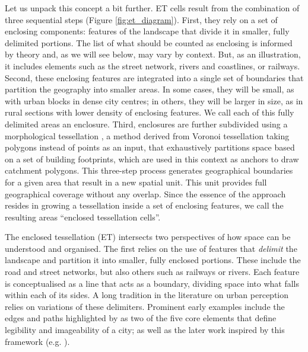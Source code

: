 Let us unpack this concept a bit further. ET cells result from the combination of
three sequential steps (Figure \ref{fig:et_diagram}).
First, they rely on a set of enclosing components: features of the landscape
that divide it in smaller, fully delimited portions. The list of what should be
counted as enclosing is informed by theory and, as we will see below, may vary
by context. But, as an illustration, it includes elements such as the street
network, rivers and coastlines, or railways.
Second, these enclosing features are integrated into a single set of boundaries
that partition the geography into smaller areas. In some cases, they will be
small, as with urban blocks in dense city centres; in others, they will be
larger in size, as in rural sections with lower density of enclosing features.
We call each of this fully delimited areas an enclosure.
Third, enclosures are further subdivided using a morphological tessellation
\citep{fleischmann2020morphological}, a method derived from Voronoi tessellation taking polygons instead of points as an input,
that exhaustively partitions space based on a set of building footprints,
which are used in this context as anchors to draw catchment polygons.
This three-step process generates geographical boundaries for a given area that result in a
new spatial unit. This unit provides full geographical coverage without any
overlap.
%
Since the essence of the approach resides in growing a tessellation inside a set
of enclosing features, we call the resulting areas ``enclosed tessellation
cells''.

The enclosed tessellation (ET) intersects two perspectives of how space can be
understood and organised.
%
The first relies on the use of features that \textit{delimit} the landscape and
partition it into smaller, fully enclosed portions. These include the road and
street networks, but also others such as railways or rivers. Each feature is
conceptualised as a line that acts as a boundary, dividing space into what falls
within each of its sides.
%
A long tradition in the literature on urban perception relies on
variations of these delimiters. Prominent
early examples include the edges and paths highlighted by \cite{lynch1960} as
two of the five core elements that define legibility and imageability of a city;
as well as the later work inspired by this framework (e.g. \citealp{filomena2019a}).


